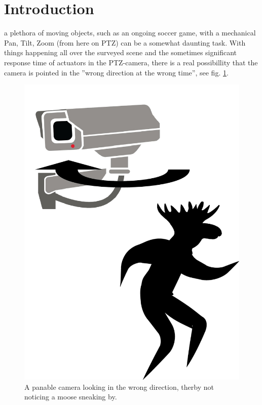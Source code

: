 \section{Introduction}


 a plethora of moving objects, such as an ongoing soccer game, with a mechanical Pan, Tilt, Zoom (from here on PTZ) can be a somewhat daunting task. With things happening all over the surveyed scene and the sometimes significant response time of actuators in the PTZ-camera, there is a real possibillity that the camera is pointed in the ''wrong direction at the wrong time'', see fig. \ref{fig:problem}.

\begin{figure}[H]
	\centering
	\includegraphics[width=0.5 \columnwidth]{../results/images/PTZ_problem.jpg}
	\caption{A panable camera looking in the wrong direction, therby not noticing a moose sneaking by.}
	\label{fig:problem}
\end{figure}

